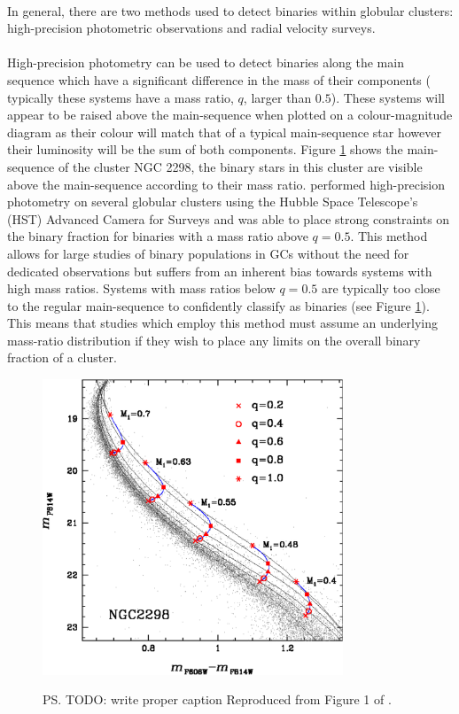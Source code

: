 \paragraph{}
In general, there are two methods used to detect binaries within globular clusters: high-precision
photometric observations and radial velocity surveys.

\paragraph{}
High-precision photometry can be used to detect binaries along the main sequence which have a
significant difference in the mass of their components ( typically these systems have a mass ratio,
$q$, larger than $0.5$). These systems will appear to be raised above the main-sequence when plotted
on a colour-magnitude diagram as their colour will match that of a typical main-sequence star
however their luminosity will be the sum of both components. Figure
\ref{fig:1/main_sequence_binaries} shows the main-sequence of the cluster NGC 2298, the binary stars
in this cluster are visible above the main-sequence according to their mass ratio.
\citet{Milone2012} performed high-precision photometry on several globular clusters using the Hubble
Space Telescope's (HST) Advanced Camera for Surveys and was able to place strong constraints on the
binary fraction for binaries with a mass ratio above $q=0.5$. This method allows for large studies
of binary populations in GCs without the need for dedicated observations but suffers from an
inherent bias towards systems with high mass ratios. Systems with mass ratios below $q=0.5$ are
typically too close to the regular main-sequence to confidently classify as binaries (see Figure
\ref{fig:1/main_sequence_binaries}). This means that studies which employ this method must assume an
underlying mass-ratio distribution if they wish to place any limits on the overall binary fraction
of a cluster.


\begin{figure}
	\centering
	\includegraphics[width=0.8\textwidth]{"./figures/main_sequence_binaries.pdf"}
	\label{fig:1/main_sequence_binaries}
\caption{\ps{TODO: write proper caption} Reproduced from Figure 1 of \citet{Milone2012}.}
\end{figure}



